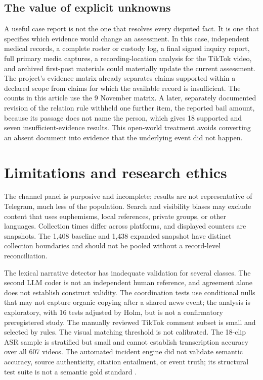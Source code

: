 \subsection{The value of explicit unknowns}

A useful case report is not the one that resolves every disputed fact. It is one that specifies which evidence would change an assessment. In this case, independent medical records, a complete roster or custody log, a final signed inquiry report, full primary media captures, a recording-location analysis for the TikTok video, and archived first-post materials could materially update the current assessment. The project's evidence matrix already separates claims supported within a declared scope from claims for which the available record is insufficient. The counts in this article use the 9 November matrix. A later, separately documented revision of the relation rule withheld one further item, the reported bail amount, because its passage does not name the person, which gives 18 supported and seven insufficient-evidence results. This open-world treatment avoids converting an absent document into evidence that the underlying event did not happen.

\section{Limitations and research ethics}

The channel panel is purposive and incomplete; results are not representative of Telegram, much less of the population. Search and visibility biases may exclude content that uses euphemisms, local references, private groups, or other languages. Collection times differ across platforms, and displayed counters are snapshots. The 1,408 baseline and 1,438 expanded snapshot have distinct collection boundaries and should not be pooled without a record-level reconciliation.

The lexical narrative detector has inadequate validation for several classes. The second LLM coder is not an independent human reference, and agreement alone does not establish construct validity. The coordination tests use conditional nulls that may not capture organic copying after a shared news event; the analysis is exploratory, with 16 tests adjusted by Holm, but is not a confirmatory preregistered study. The manually reviewed TikTok comment subset is small and selected by rules. The visual matching threshold is not calibrated. The 18-clip ASR sample is stratified but small and cannot establish transcription accuracy over all 607 videos. The automated incident engine did not validate semantic accuracy, source authenticity, citation entailment, or event truth; its structural test suite is not a semantic gold standard \citep{socialcaseengine2026}.

